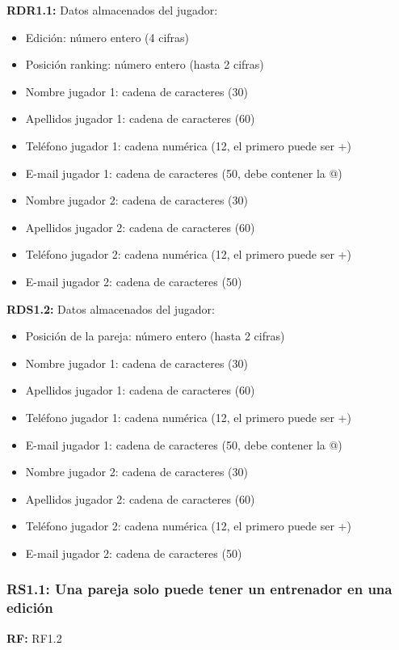 \textbf{RDR1.1:} Datos almacenados del jugador:
\begin{itemize}
	\item Edición: número entero (4 cifras)
	\item Posición ranking: número entero (hasta 2 cifras)
\newline
	\item Nombre jugador 1: cadena de caracteres (30)
	\item Apellidos jugador 1: cadena de caracteres (60)
	\item Teléfono jugador 1: cadena numérica (12, el primero puede ser +)
	\item E-mail jugador 1: cadena de caracteres (50, debe contener la @)
\newline
	\item Nombre jugador 2: cadena de caracteres (30)
	\item Apellidos jugador 2: cadena de caracteres (60)
	\item Teléfono jugador 2: cadena numérica (12, el primero puede ser  +)
	\item E-mail jugador 2: cadena de caracteres (50)
\end{itemize}

\textbf{RDS1.2:} Datos almacenados del jugador:
\begin{itemize}
	\item Posición de la pareja: número entero (hasta 2 cifras)
\newline
	\item Nombre jugador 1: cadena de caracteres (30)
	\item Apellidos jugador 1: cadena de caracteres (60)
	\item Teléfono jugador 1: cadena numérica (12, el primero puede ser +)
	\item E-mail jugador 1: cadena de caracteres (50, debe contener la @)
\newline
	\item Nombre jugador 2: cadena de caracteres (30)
	\item Apellidos jugador 2: cadena de caracteres (60)
	\item Teléfono jugador 2: cadena numérica (12, el primero puede ser  +)
	\item E-mail jugador 2: cadena de caracteres (50)
\end{itemize}

\subsubsection{RS1.1: Una pareja solo puede tener un entrenador en una edición}
\textbf{RF:} RF1.2

